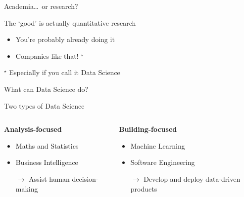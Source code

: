 \begin{frame}{Academia\ldots~or research?}
    \begin{block}{The `good' is actually quantitative research}
        \begin{itemize}
            \item You're probably already doing it
            \item Companies like that! $^{\star}$
        \end{itemize}
    \end{block}
    \begin{flushright}
        {\scriptsize
         $^{\star}$ Especially if you call it Data Science}
    \end{flushright}
\end{frame}

\begin{frame}
    \begin{center}
        \LARGE%
        What can Data Science do?
    \end{center}
\end{frame}

\begin{frame}{Two types of Data Science}
    \begin{columns}
        \begin{column}{0.5\textwidth}
            \begin{center}
                \large\bf%
                Analysis\hyp{}focused
            \end{center}
            \begin{itemize}
                \item Maths and Statistics
                \item Business Intelligence
                \item[$\to$] Assist human decision\hyp{}making
            \end{itemize}
        \end{column}
        \begin{column}{0.5\textwidth}
            \begin{center}
                \large\bf%
                Building\hyp{}focused
            \end{center}
            \begin{itemize}
                \item Machine Learning
                \item Software Engineering
                \item[$\to$] Develop and deploy data\hyp{}driven products
            \end{itemize}
        \end{column}
    \end{columns}
\end{frame}

